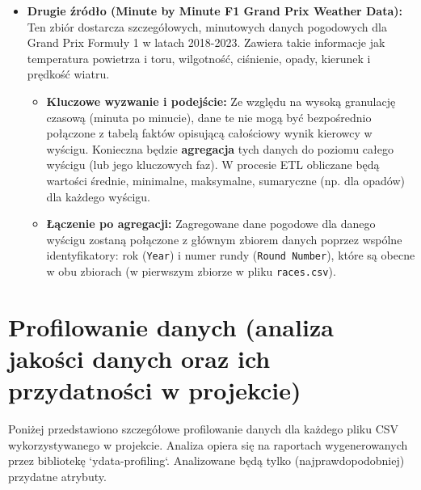 \documentclass[a4paper,12pt]{article}
\begin{document}
\begin{itemize}[label=\textbullet, leftmargin=*]
  \item \textbf{Drugie źródło (Minute by Minute F1 Grand Prix Weather Data):} Ten zbiór dostarcza szczegółowych, minutowych danych pogodowych dla Grand Prix Formuły 1 w latach 2018-2023. Zawiera takie informacje jak temperatura powietrza i toru, wilgotność, ciśnienie, opady, kierunek i prędkość wiatru.
        \begin{itemize}[label=\textendash, leftmargin=1em]
          \item \textbf{Kluczowe wyzwanie i podejście:} Ze względu na wysoką granulację czasową (minuta po minucie), dane te nie mogą być bezpośrednio połączone z tabelą faktów opisującą całościowy wynik kierowcy w wyścigu. Konieczna będzie \textbf{agregacja} tych danych do poziomu całego wyścigu (lub jego kluczowych faz). W procesie ETL obliczane będą wartości średnie, minimalne, maksymalne, sumaryczne (np. dla opadów) dla każdego wyścigu.
          \item \textbf{Łączenie po agregacji:} Zagregowane dane pogodowe dla danego wyścigu zostaną połączone z głównym zbiorem danych poprzez wspólne identyfikatory: rok (\texttt{Year}) i numer rundy (\texttt{Round Number}), które są obecne w obu zbiorach (w pierwszym zbiorze w pliku \texttt{races.csv}).
        \end{itemize}
\end{itemize}

\section{Profilowanie danych (analiza jakości danych oraz ich przydatności w projekcie)}
\label{sec:profilowanie_danych_final}
Poniżej przedstawiono szczegółowe profilowanie danych dla każdego pliku CSV wykorzystywanego w projekcie. Analiza opiera się na raportach wygenerowanych przez bibliotekę `ydata-profiling`. Analizowane będą tylko (najprawdopodobniej) przydatne atrybuty.
\end{document}

